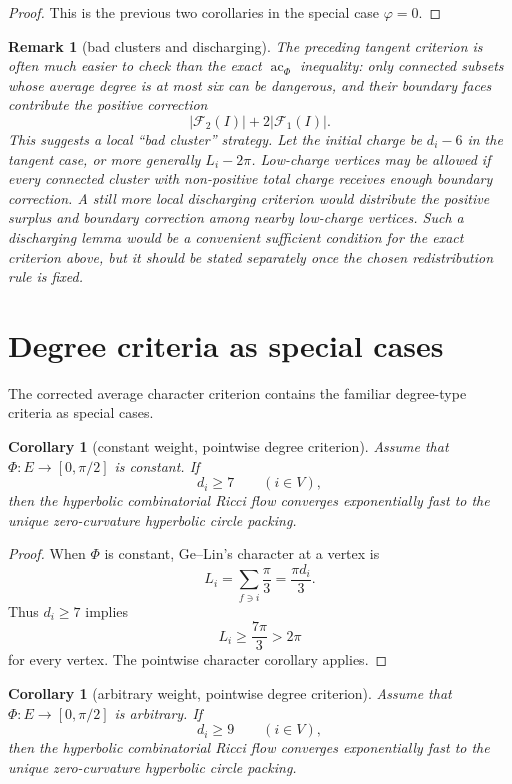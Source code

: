 \documentclass[11pt]{article}
\newtheorem{corollary}[theorem]{Corollary}
\newtheorem{remark}[theorem]{Remark}
\newcommand{\Phiw}{\Phi}
\newcommand{\ac}{\operatorname{ac}}
\begin{document}
\begin{proof}
This is the previous two corollaries in the special case $\varphi=0$.
\end{proof}

\begin{remark}[bad clusters and discharging]
The preceding tangent criterion is often much easier to check than the
exact $\ac_\Phi$ inequality: only connected subsets whose average degree is
at most six can be dangerous, and their boundary faces contribute the
positive correction
\[
  |\mathcal F_2(I)|+2|\mathcal F_1(I)|.
\]
This suggests a local ``bad cluster'' strategy.  Let the initial charge be
$d_i-6$ in the tangent case, or more generally $L_i-2\pi$.  Low-charge
vertices may be allowed if every connected cluster with non-positive total
charge receives enough boundary correction.  A still more local
discharging criterion would distribute the positive surplus and boundary
correction among nearby low-charge vertices.  Such a discharging lemma
would be a convenient sufficient condition for the exact criterion above,
but it should be stated separately once the chosen redistribution rule is
fixed.
\end{remark}

\section{Degree criteria as special cases}

The corrected average character criterion contains the familiar
degree-type criteria as special cases.

\begin{corollary}[constant weight, pointwise degree criterion]
Assume that $\Phiw:E\to[0,\pi/2]$ is constant.  If
\[
  d_i\ge7\qquad (i\in V),
\]
then the hyperbolic combinatorial Ricci flow converges exponentially fast
to the unique zero-curvature hyperbolic circle packing.
\end{corollary}

\begin{proof}
When $\Phiw$ is constant, Ge--Lin's character at a vertex is
\[
  L_i=\sum_{f\ni i}\frac{\pi}{3}=\frac{\pi d_i}{3}.
\]
Thus $d_i\ge7$ implies
\[
  L_i\ge\frac{7\pi}{3}>2\pi
\]
for every vertex.  The pointwise character corollary applies.
\end{proof}

\begin{corollary}[arbitrary weight, pointwise degree criterion]
Assume that $\Phiw:E\to[0,\pi/2]$ is arbitrary.  If
\[
  d_i\ge9\qquad (i\in V),
\]
then the hyperbolic combinatorial Ricci flow converges exponentially fast
to the unique zero-curvature hyperbolic circle packing.
\end{corollary}
\end{document}
